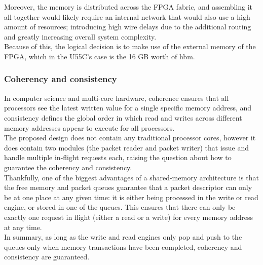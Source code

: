 Moreover, the memory is distributed across the FPGA fabric, and assembling it all together would likely require an internal network
that would also use a high amount of resources; introducing high wire delays due to the additional routing and greatly increasing 
overall system complexity.\\

Because of this, the logical decision is to make use of the external memory of the FPGA, which in the U55C's case is the 16 GB worth
of \gls{hbm}.


\subsubsection{Coherency and consistency}

In computer science and multi-core hardware, coherence ensures that all processors see the latest
written value for a single specific memory address, and consistency defines the global order
in which read and writes across different memory addresses appear to execute for all processors.\\

The proposed design does not contain any traditional processor cores, however it does contain two
modules (the packet reader and packet writer) that issue and handle multiple in-flight requests each,
raising the question about how to guarantee the coherency and consistency.\\

Thankfully, one of the biggest advantages of a shared-memory architecture is that the free memory and packet
queues guarantee that a packet descriptor can only be at one place at any given time: it is either
being processed in the write or read engine, or stored in one of the queues. This ensures that there can only
be exactly one request in flight (either a read or a write) for every memory address at any time.\\

In summary, as long as the write and read engines only pop and push to the queues only when memory
transactions have been completed, coherency and consistency are guaranteed.\\


